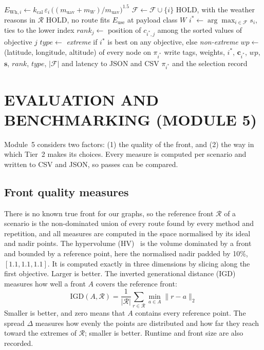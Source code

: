 \begin{algorithm}[p]
\begin{algorithmic}[1]
  \State $E_{\mathrm{Wh},i} \gets k_\mathrm{cal}\,\varepsilon_i\,\big((m_\mathrm{uav}+m_W)/m_\mathrm{uav}\big)^{1.5}$ 
   $\mathcal{F} \gets \mathcal{F} \cup \{i\}$ \EndIf
\EndFor
{}
  \State \Return HOLD, with the weather reasons in $\mathcal{R}$
  \State \Return HOLD, no route fits $E_\mathrm{use}$ at payload class $W$
\EndIf
\State $i^* \gets \arg\max_{i \in \mathcal{F}} s_i$, ties to the lower index 
\State $\mathit{rank}_j \gets$ position of $c_{i^*,j}$ among the sorted values of objective $j$
\State $\mathit{type} \gets$ \textit{extreme} if $i^*$ is best on any objective, else \textit{non-extreme}
\State $\mathit{wp} \gets$ (latitude, longitude, altitude) of every node on $\pi_{i^*}$
\State write tags, weights, $i^*$, $\mathbf{c}_{i^*}$, $\mathit{wp}$, $\mathbf{s}$, $\mathit{rank}$, $\mathit{type}$, $|\mathcal{F}|$ and latency to JSON and CSV
\State \Return $\pi_{i^*}$ and the selection record
\end{algorithmic}
\end{algorithm}

\section{EVALUATION AND BENCHMARKING (MODULE 5)}\label{sec:m5}

Module~5 considers two factors: (1) the quality of the front, and (2) the way in which
Tier~2 makes its choices. Every measure is computed per scenario and written to CSV and JSON, so passes can be compared.

\subsection{Front quality measures}

There is no known true front for our graphs, so the reference front $\mathcal{R}$ of a
scenario is the non-dominated union of every route found by every method and
repetition, and all measures are computed in the space normalised by its ideal and
nadir points. The hypervolume (HV)~\cite{r18} is the volume dominated by a front and bounded by a
reference point, here the normalised nadir padded by 10\%, $[1.1, 1.1, 1.1]$. It is
computed exactly in three dimensions by slicing along the first objective. Larger is better. The inverted generational
distance (IGD) measures how well a front $A$ covers the reference front:
\begin{equation}
  \mathrm{IGD}(A, \mathcal{R}) = \frac{1}{\lvert\mathcal{R}\rvert}\sum_{r \in \mathcal{R}} \min_{a \in A} \lVert r - a \rVert_2
\end{equation}
Smaller is better, and zero means that $A$ contains every reference point. The spread
$\Delta$ measures how evenly the points are distributed and how far they reach toward
the extremes of $\mathcal{R}$; smaller is better.  Runtime and front size are also recorded.

